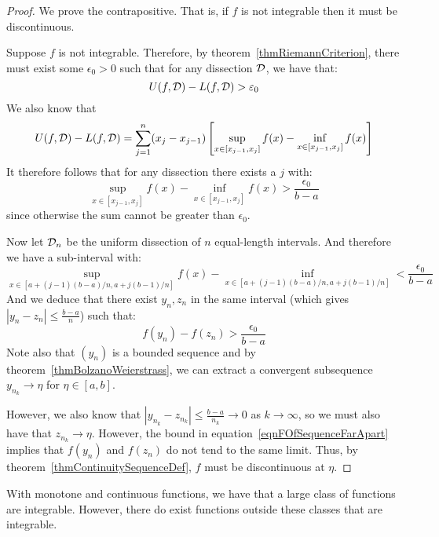 \documentclass[../Main.tex]{subfiles}
\begin{document}
\begin{proof}
    We prove the contrapositive. That is, if $f$ is not integrable then it must be discontinuous.

    Suppose $f$ is not integrable. Therefore, by theorem~\ref{thmRiemannCriterion}, there must exist some $\epsilon_0 > 0$ such that for any dissection $\mathcal{D}$, we have that:
    \begin{equation*}
        U(f, \mathcal{D}) - L(f, \mathcal{D}) > \varepsilon_0
    \end{equation*}
    We also know that
    \begin{equation*}
        U(f, \mathcal{D}) - L(f, \mathcal{D}) = \sum_{j = 1}^n (x_j - x_{j - 1})\left[\sup_{x \in [x_{j-1}, x_j]} f(x) - \inf_{x \in [x_{j-1}, x_j]} f(x)\right]
    \end{equation*}
    It therefore follows that for any dissection there exists a $j$ with:
    \begin{equation*}
        \sup_{x \in [x_{j-1}, x_j]} f(x) - \inf_{x \in [x_{j-1}, x_j]} f(x) > \frac{\epsilon_0}{b - a}
    \end{equation*}
    since otherwise the sum cannot be greater than $\epsilon_0$.

    Now let $\mathcal{D}_n$ be the uniform dissection of $n$ equal-length intervals. And therefore we have a sub-interval with:
    \begin{equation*}
        \sup_{x \in [a + (j-1)(b-a)/n, a + j(b-1)/n]} f(x) - \inf_{x \in [a + (j-1)(b-a)/n, a + j(b-1)/n]} < \frac{\epsilon_0}{b - a}
    \end{equation*}
    And we deduce that there exist $y_n, z_n$ in the same interval (which gives $|y_n - z_n| \leq \frac{b - a}{n}$) such that:
    \begin{equation}
        f(y_n) - f(z_n) > \frac{\epsilon_0}{b - a}
        \label{eqnFOfSequenceFarApart}
    \end{equation}
    Note also that $(y_n)$ is a bounded sequence and by theorem~\ref{thmBolzanoWeierstrass}, we can extract a convergent subsequence $y_{n_k} \to \eta$ for $\eta \in [a, b]$.

    However, we also know that $|y_{n_k} - z_{n_k}| \leq \frac{b-a}{n_k} \to 0$ as $k \to \infty$, so we must also have that $z_{n_k} \to \eta$. However, the bound in equation~\ref{eqnFOfSequenceFarApart} implies that $f(y_n)$ and $f(z_n)$ do not tend to the same limit. Thus, by theorem~\ref{thmContinuitySequenceDef}, $f$ must be discontinuous at $\eta$.
\end{proof}
\begin{remark}
    With monotone and continuous functions, we have that a large class of functions are integrable. However, there do exist functions outside these classes that are integrable.
\end{remark}
\end{document}
